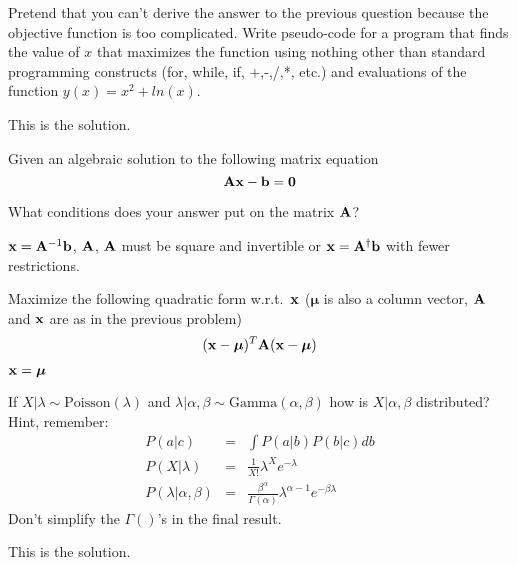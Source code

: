 \documentclass[12pt]{article}
\begin{document}
{
Pretend that you can't derive the answer to the previous question because the objective function is too complicated.  Write pseudo-code for a program that finds the value of $x$ that maximizes the function using nothing other than standard programming constructs (for, while, if, +,-,/,*, etc.) and evaluations of the function $y(x) = x^2+ln(x)$.
}
{
\vspace{3.5in}
\vfill
\newpage

}
{

This is the solution.  
}


{
\abcs
\item
Given an algebraic solution to the following matrix equation
\[ {\bf A} {\bf x} - {\bf b} = {\bf 0}\]
\item
What conditions does your answer put on the matrix ${\bf A}$?
\endabcs
}
{
\vspace{3cm}
\vfill
  \answer
}
{
${\bf x} = {\bf A}^{-1}{\bf b}$, ${\bf A}$, ${\bf A}$ must be square and invertible or ${\bf x} = {\bf A}^\dagger{\bf b}$ with fewer restrictions.
}

{
\abcs
\item
Maximize the following quadratic form w.r.t.~${\bf x}$ ($ \boldsymbol{\mu}$ is also a column vector, ${\bf A}$ and $\bf x$ are as in the previous problem)
\[ ({\bf x - \boldsymbol{\mu}})^T{\bf A}( {\bf x -  \boldsymbol{\mu}} )\]
\endabcs
}
{
\vspace{3cm}
\vfill

  \answer
  \newpage
}
{
$\bf x = \boldsymbol{\mu}$
}

{
If $X | \lambda \sim \mathrm{Poisson}(\lambda)$ and $\lambda | \alpha, \beta \sim \mathrm{Gamma}(\alpha, \beta)$ how is $X|\alpha, \beta$ distributed?  Hint, remember:
\begin{eqnarray*}
P(a|c) &=& \int P(a|b) P(b|c) db \\
P(X|\lambda) &=& \frac{1}{X!}\lambda^X e^{-\lambda} \\
P(\lambda|\alpha, \beta) &=& \frac{\beta^\alpha}{\Gamma(\alpha)}\lambda^{\alpha-1} e^{-\beta\lambda} 
\end{eqnarray*}
Don't simplify the $\Gamma()$'s in the final result.
}
{
\vspace{3.5in}
\vfill
\newpage

}
{

This is the solution.  
}
\end{document}
